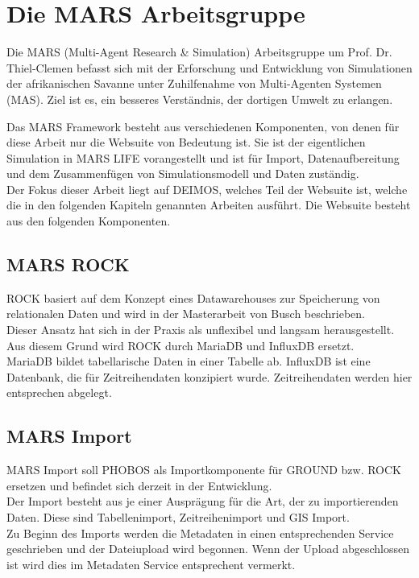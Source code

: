 \documentclass[10pt,conference,compsocconf]{IEEEtran}
\begin{document}
\section{Die MARS Arbeitsgruppe}
Die MARS (Multi-Agent Research \& Simulation) Arbeitsgruppe um Prof. Dr. Thiel-Clemen befasst sich mit der Erforschung und Entwicklung von Simulationen der afrikanischen Savanne unter Zuhilfenahme von Multi-Agenten Systemen (MAS). Ziel ist es, ein besseres Verständnis, der dortigen Umwelt zu erlangen. \par
Das MARS Framework besteht aus verschiedenen Komponenten, von denen für diese Arbeit nur die Websuite von Bedeutung ist. Sie ist der eigentlichen Simulation in MARS LIFE vorangestellt und ist für Import, Datenaufbereitung und dem Zusammenfügen von Simulationsmodell und Daten zuständig. \\
\indent Der Fokus dieser Arbeit liegt auf DEIMOS, welches Teil der Websuite ist, welche die in den folgenden Kapiteln genannten Arbeiten ausführt. Die Websuite besteht aus den folgenden Komponenten.


\subsection{MARS ROCK}
ROCK basiert auf dem Konzept eines Datawarehouses zur Speicherung von relationalen Daten und wird in der Masterarbeit von Busch\cite{JanBusch} beschrieben. \\
Dieser Ansatz hat sich in der Praxis als unflexibel und langsam herausgestellt. Aus diesem Grund wird ROCK durch MariaDB und InfluxDB ersetzt. \\
MariaDB bildet tabellarische Daten in einer Tabelle ab. InfluxDB ist eine Datenbank, die für Zeitreihendaten konzipiert wurde. Zeitreihendaten werden hier entsprechen abgelegt.


\subsection{MARS Import}
\label{sub:Import}
MARS Import soll PHOBOS als Importkomponente für GROUND bzw. ROCK ersetzen und befindet sich derzeit in der Entwicklung. \\
Der Import besteht aus je einer Ausprägung für die Art, der zu importierenden Daten. Diese sind Tabellenimport, Zeitreihenimport und GIS Import. \\
Zu Beginn des Imports werden die Metadaten in einen entsprechenden Service geschrieben und der Dateiupload wird begonnen. Wenn der Upload abgeschlossen ist wird dies im Metadaten Service entsprechent vermerkt.
\end{document}
